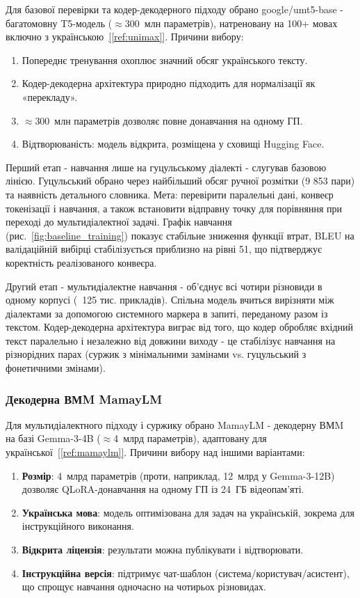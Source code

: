 \documentclass[14pt]{extarticle}
\newcommand{\citeref}[1]{\hyperref[#1]{[\ref*{#1}]}}
\begin{document}
Для базової перевірки та кодер-декодерного підходу обрано google/umt5-base - багатомовну T5-модель ($\approx$300~млн параметрів), натреновану на 100+ мовах включно з українською~\citeref{ref:unimax}. Причини вибору:
\begin{enumerate}
  \item Попереднє тренування охоплює значний обсяг українського тексту.
  \item Кодер-декодерна архітектура природно підходить для нормалізації як «перекладу».
  \item $\approx$300~млн параметрів дозволяє повне донавчання на одному ГП.
  \item Відтворюваність: модель відкрита, розміщена у сховищі Hugging Face.
\end{enumerate}

Перший етап - навчання лише на гуцульському діалекті - слугував базовою лінією. Гуцульський обрано через найбільший обсяг ручної розмітки (9 853 пари) та наявність детального словника. Мета: перевірити паралельні дані, конвеєр токенізації і навчання, а також встановити відправну точку для порівняння при переході до мультидіалектної задачі. Графік навчання (рис.~\ref{fig:baseline_training}) показує стабільне зниження функції втрат, BLEU на валідаційній вибірці стабілізується приблизно на рівні 51, що підтверджує коректність реалізованого конвеєра.

Другий етап - мультидіалектне навчання - об'єднує всі чотири різновиди в одному корпусі (~125 тис. прикладів). Спільна модель вчиться вирізняти між діалектами за допомогою системного маркера в запиті, переданому разом із текстом. Кодер-декодерна архітектура виграє від того, що кодер обробляє вхідний текст паралельно і незалежно від довжини виходу - це стабілізує навчання на різнорідних парах (суржик з мінімальними замінами vs. гуцульський з фонетичними змінами).

\subsubsection{Декодерна ВМM MamayLM}

Для мультидіалектного підходу і суржику обрано MamayLM - декодерну ВМM на базі Gemma-3-4B ($\approx$4~млрд параметрів), адаптовану для української~\citeref{ref:mamaylm}. Причини вибору над іншими варіантами:
\begin{enumerate}
  \item \textbf{Розмір}: 4~млрд параметрів (проти, наприклад, 12~млрд у Gemma-3-12B) дозволяє QLoRA-до\-на\-вчан\-ня на одному ГП із 24~ГБ відеопам'яті.
  \item \textbf{Українська мова}: модель оптимізована для задач на українській, зокрема для інструкційного виконання.
  \item \textbf{Відкрита ліцензія}: результати можна публікувати і відтворювати.
  \item \textbf{Інструкційна версія}: підтримує чат-шаблон (система/користувач/асистент), що спрощує навчання одночасно на чотирьох різновидах.
\end{enumerate}
\end{document}
